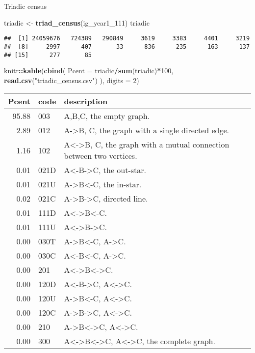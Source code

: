 \documentclass[]{book}
\newenvironment{Shaded}{\begin{snugshade}}{\end{snugshade}}
\newcommand{\KeywordTok}[1]{\textcolor[rgb]{0.13,0.29,0.53}{\textbf{#1}}}
\newcommand{\DataTypeTok}[1]{\textcolor[rgb]{0.13,0.29,0.53}{#1}}
\newcommand{\DecValTok}[1]{\textcolor[rgb]{0.00,0.00,0.81}{#1}}
\newcommand{\StringTok}[1]{\textcolor[rgb]{0.31,0.60,0.02}{#1}}
\newcommand{\OperatorTok}[1]{\textcolor[rgb]{0.81,0.36,0.00}{\textbf{#1}}}
\newcommand{\NormalTok}[1]{#1}
\theoremstyle{definition}
\theoremstyle{definition}
\theoremstyle{definition}
\theoremstyle{remark}
\begin{document}
Triadic census

\begin{Shaded}
\begin{Highlighting}[]
\NormalTok{triadic <-}\StringTok{ }\KeywordTok{triad_census}\NormalTok{(ig_year1_}\DecValTok{111}\NormalTok{)}
\NormalTok{triadic}
\end{Highlighting}
\end{Shaded}

\begin{verbatim}
##  [1] 24059676   724389   290849     3619     3383     4401     3219
##  [8]     2997      407       33      836      235      163      137
## [15]      277       85
\end{verbatim}

\begin{Shaded}
\begin{Highlighting}[]
\NormalTok{knitr}\OperatorTok{::}\KeywordTok{kable}\NormalTok{(}\KeywordTok{cbind}\NormalTok{(}
  \DataTypeTok{Pcent =}\NormalTok{ triadic}\OperatorTok{/}\KeywordTok{sum}\NormalTok{(triadic)}\OperatorTok{*}\DecValTok{100}\NormalTok{,}
  \KeywordTok{read.csv}\NormalTok{(}\StringTok{"triadic_census.csv"}\NormalTok{)}
\NormalTok{  ), }\DataTypeTok{digits =} \DecValTok{2}\NormalTok{)}
\end{Highlighting}
\end{Shaded}

\begin{tabular}{r|l|l}
\hline
Pcent & code & description\\
\hline
95.88 & 003 & A,B,C, the empty graph.\\
\hline
2.89 & 012 & A->B, C, the graph with a single directed edge.\\
\hline
1.16 & 102 & A<->B, C, the graph with a mutual connection between two vertices.\\
\hline
0.01 & 021D & A<-B->C, the out-star.\\
\hline
0.01 & 021U & A->B<-C, the in-star.\\
\hline
0.02 & 021C & A->B->C, directed line.\\
\hline
0.01 & 111D & A<->B<-C.\\
\hline
0.01 & 111U & A<->B->C.\\
\hline
0.00 & 030T & A->B<-C, A->C.\\
\hline
0.00 & 030C & A<-B<-C, A->C.\\
\hline
0.00 & 201 & A<->B<->C.\\
\hline
0.00 & 120D & A<-B->C, A<->C.\\
\hline
0.00 & 120U & A->B<-C, A<->C.\\
\hline
0.00 & 120C & A->B->C, A<->C.\\
\hline
0.00 & 210 & A->B<->C, A<->C.\\
\hline
0.00 & 300 & A<->B<->C, A<->C, the complete graph.\\
\hline
\end{tabular}
\end{document}
